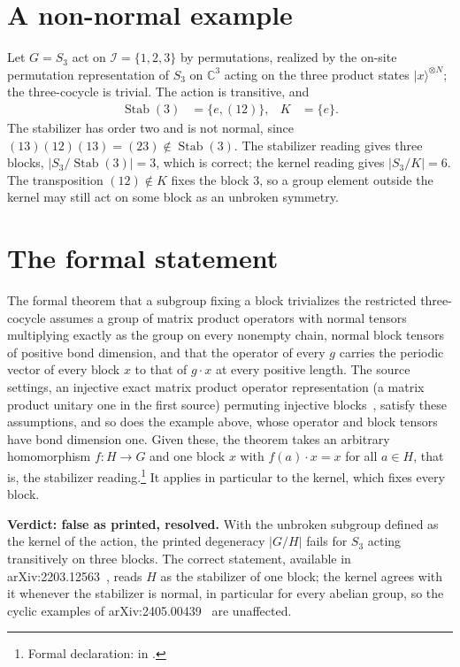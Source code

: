 \documentclass{article}
\begin{document}
\section{A non-normal example}

Let $G=S_3$ act on $\mathcal I=\{1,2,3\}$ by permutations, realized by the
on-site permutation representation of $S_3$ on $\mathbb C^3$ acting on the
three product states $|x\rangle^{\otimes N}$; the three-cocycle is trivial.
The action is transitive, and
\begin{align}
    \operatorname{Stab}(3) & =\{e,(12)\}, &
    K                      & =\{e\}.
    \label{eq:gs24_s3_subgroups}
\end{align}
The stabilizer has order two and is not normal, since
$(13)(12)(13)=(23)\notin\operatorname{Stab}(3)$. The stabilizer reading
gives three blocks, $|S_3/\operatorname{Stab}(3)|=3$, which is correct; the
kernel reading gives $|S_3/K|=6$. The transposition $(12)\notin K$ fixes the
block $3$, so a group element outside the kernel may still act on some block
as an unbroken symmetry.

\section{The formal statement}

The formal theorem that a subgroup fixing a block trivializes the
restricted three-cocycle assumes a group of matrix product operators with
normal tensors multiplying exactly as the group on every nonempty chain,
normal block tensors of positive bond dimension, and that the operator of
every $g$ carries the periodic vector of every block $x$ to that of
$g\cdot x$ at every positive length. The source settings, an injective
exact matrix product operator representation (a matrix product unitary one in
the first source) permuting injective
blocks~\cite{GarreRubio2023MPOSym,GarreRubioSchuch2024DomainWall}, satisfy
these assumptions, and
so does the example above, whose operator and block tensors have bond
dimension one. Given these, the theorem takes an arbitrary homomorphism
$f:H\to G$ and one block $x$ with $f(a)\cdot x=x$ for all $a\in H$, that is,
the stabilizer reading.\footnote{Formal declaration:
    in .} It applies in
particular to the kernel, which fixes every block.

\textbf{Verdict: false as printed, resolved.} With the unbroken subgroup
defined as the kernel of the action, the printed degeneracy $|G/H|$ fails for
$S_3$ acting transitively on three blocks. The correct statement, available in
arXiv:2203.12563~\cite{GarreRubio2023MPOSym}, reads $H$ as the stabilizer of one block; the kernel agrees
with it whenever the stabilizer is normal, in particular for every abelian
group, so the cyclic examples of arXiv:2405.00439~\cite{GarreRubioSchuch2024DomainWall} are unaffected.



\end{document}
